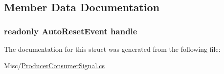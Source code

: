 \subsection{Member Data Documentation}
\hypertarget{structOTA_1_1Misc_1_1ProducerConsumerSignal_a2c28aaa7c38781d0b5056178e68cbc33}{}
\subsubsection[{handle}]{\setlength{\rightskip}{0pt plus 5cm}readonly Auto\+Reset\+Event handle}\label{structOTA_1_1Misc_1_1ProducerConsumerSignal_a2c28aaa7c38781d0b5056178e68cbc33}


The documentation for this struct was generated from the following file\+:\begin{DoxyCompactItemize}
\item 
Misc/\hyperlink{ProducerConsumerSignal_8cs}{Producer\+Consumer\+Signal.\+cs}\end{DoxyCompactItemize}
